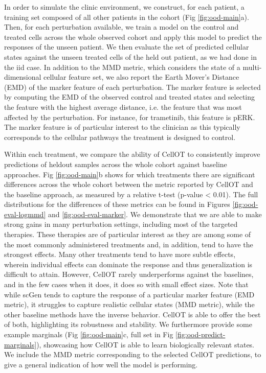 In order to simulate the clinic environment, we construct, for each patient, a training set composed of all other patients in the cohort (Fig \ref{fig:ood-main}a).
Then, for each perturbation available,
we train a model on the control and treated cells across the whole observed cohort
and apply this model to predict the responses of the unseen patient.
We then evaluate the set of predicted cellular states against the unseen treated cells of the held out patient, as we had done in the iid case.
In addition to the MMD metric, which considers the state of a multi-dimensional cellular feature set,
we also report the Earth Mover’s Distance (EMD) of the marker feature of each perturbation.
The marker feature is selected by computing the EMD of the observed control and treated states and selecting the feature with the highest average distance,
i.e. the feature that was most affected by the perturbation.
For instance, for trametinib, this feature is pERK.
The marker feature is of particular interest to the clinician as this typically corresponds to the cellular pathways the treatment is designed to control.

Within each treatment, we compare the ability of CellOT to consistently improve predictions of heldout samples across the whole cohort against baseline approaches.
Fig \ref{fig:ood-main}b shows for which treatments there are significant differences across the whole cohort between
the metric reported by CellOT and the baseline approach, as measured by a relative t-test (p-value < 0.01).
The full distributions for the differences of these metrics can be found in Figures \ref{fig:ood-eval-logmmd} and \ref{fig:ood-eval-marker}.
We demonstrate that we are able to make strong gains in many perturbation settings, including most of the targeted therapies.
These therapies are of particular interest as they are among some of the most commonly administered treatments \cite{} and, in addition, tend to have the strongest effects.
Many other treatments tend to have more subtle effects, wherein individual effects can dominate the response and thus generalization is difficult to attain.
However, CellOT rarely underperforms against the baselines, and in the few cases when it does, it does so with small effect sizes.
Note that while scGen tends to capture the response of a particular marker feature (EMD metric), it struggles to capture realistic cellular states (MMD metric), while the other baseline methods have the inverse behavior.
CellOT is able to offer the best of both, highlighting its robustness and stability.
We furthermore provide some example marginals (Fig \ref{fig:ood-main}c, full set in Fig \ref{fig:ood-predict-marginals}), showcasing how CellOT is able to learn biologically relevant states.
We include the MMD metric corresponding to the selected CellOT predictions, to give a general indication of how well the model is performing.

